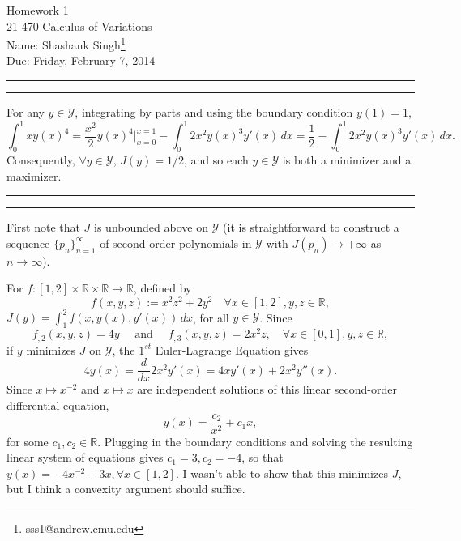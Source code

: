 \documentclass[11pt]{article}
\makeatletter
\newcounter{questionCounter}
\newcounter{partCounter}[questionCounter]
\newenvironment{question}[2][\arabic{questionCounter}]{%
    \setcounter{partCounter}{0}%
    \vspace{.25in} \hrule \vspace{0.5em}%
        \noindent{\bf #2}%
    \vspace{0.8em} \hrule \vspace{.10in}%
    \addtocounter{questionCounter}{1}%
}{}
\newcommand{\myname}{Shashank Singh\footnote{sss1@andrew.cmu.edu}}
\newcommand{\myclass}{21-470 Calculus of Variations}
\newcommand{\myhwnum}{1}
\newcommand{\duedate}{Friday, February 7, 2014}
\newcommand{\R}{\mathbb{R}}             %
\newcommand{\Y}{\mathscr{Y}}            %
\makeatother
\begin{document}
\thispagestyle{plain}

{\Large Homework \myhwnum} \\
\myclass \\
Name: \myname \\
Due: \duedate

\begin{question}{Problem 1}
For any $y \in \Y$, integrating by parts and using the boundary condition
$y(1) = 1$,
\[\int_0^1 xy(x)^4
    = \frac{x^2}{2} y(x)^4 \bigg|_{x = 0}^{x = 1}
        - \int_0^1 2x^2 y(x)^3 y'(x) \, dx
    = \frac12 - \int_0^1 2x^2 y(x)^3 y'(x) \, dx.
\]
Consequently, $\forall y \in \Y$, $J(y) = 1/2$, and so each $y \in \Y$ is both
a minimizer and a maximizer.
\end{question}

\begin{question}{Problem 2}
First note that $J$ is unbounded above on $\Y$ (it is straightforward to
construct a sequence $\{p_n\}_{n = 1}^\infty$ of second-order polynomials in
$\Y$ with $J(p_n) \to +\infty$ as $n \to \infty$).

For $f : [1,2] \times \R \times \R \to \R$, defined by
\[f(x,y,z) := x^2z^2 + 2y^2 \quad \forall x \in [1,2], y,z \in \R,\]
$J(y) = \int_1^2 f(x,y(x),y'(x)) \, dx$, for all $y \in \Y$.
Since
\[f_{,2}(x,y,z)
    = 4y
\quad \mbox{ and } \quad
f_{,3}(x,y,z)
    = 2x^2z, \quad \forall x \in [0,1], y,z \in \R,
\]
if $y$ minimizes $J$ on $\Y$, the $1^{st}$ Euler-Lagrange Equation gives
\[4y(x)
    = \frac{d}{dx} 2x^2 y'(x)
    = 4xy'(x) + 2x^2y''(x).
\]
Since $x \mapsto x^{-2}$ and $x \mapsto x$ are independent solutions of this
linear second-order differential equation,
\[y(x) = \frac{c_2}{x^2} + c_1 x,\]
for some $c_1,c_2 \in \R$. Plugging in the boundary conditions and solving the
resulting linear system of equations gives $c_1 = 3, c_2 = -4$, so that
$y(x) = -4x^{-2} + 3x, \forall x \in [1,2]$. I wasn't able to show that this
minimizes $J$, but I think a convexity argument should suffice.
\end{question}
\end{document}
